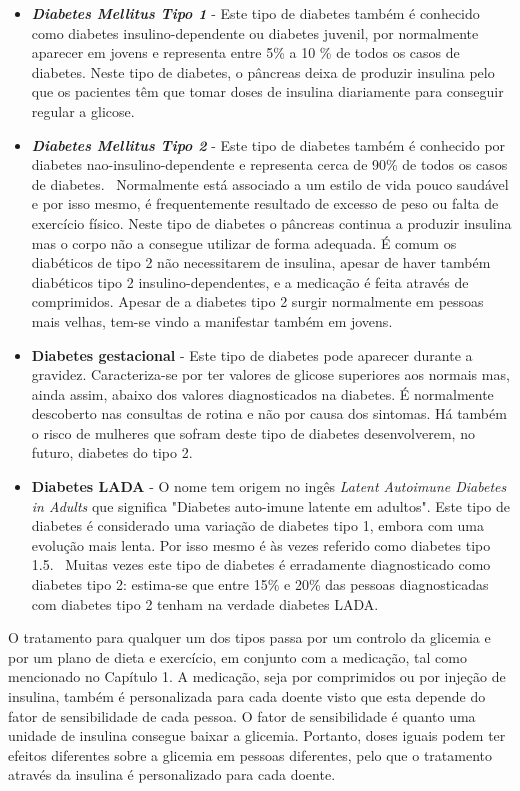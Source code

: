 \begin{itemize}
\item \textit{\textbf{Diabetes Mellitus Tipo 1}} - 
Este tipo de diabetes também é conhecido como diabetes insulino-dependente ou diabetes juvenil, por normalmente aparecer em jovens e representa entre 5\% a 10 \% de todos os casos de diabetes.\cite{epidem}
Neste tipo de diabetes, o pâncreas deixa de produzir insulina pelo que os pacientes têm que tomar doses de insulina diariamente para conseguir regular a glicose.

\item \textit{\textbf{Diabetes Mellitus Tipo 2}} - 
Este tipo de diabetes também é conhecido por diabetes nao-insulino-dependente e representa cerca de 90\% de todos os casos de diabetes.~\cite{type2} Normalmente está associado a um estilo de vida pouco saudável e por isso mesmo, é frequentemente resultado de excesso de peso ou falta de exercício físico. 
Neste tipo de diabetes o pâncreas continua a produzir insulina mas o corpo não a consegue utilizar de forma adequada.  É comum os diabéticos de tipo 2 não necessitarem de insulina, apesar de haver também diabéticos tipo 2 insulino-dependentes, e a medicação é feita através de comprimidos. Apesar de a diabetes tipo 2 surgir normalmente em pessoas mais velhas, tem-se vindo a manifestar também em jovens.

\item {\textbf{Diabetes gestacional}} - 
Este tipo de diabetes pode aparecer durante a gravidez. Caracteriza-se por ter valores de glicose superiores aos normais mas, ainda assim, abaixo dos valores diagnosticados na diabetes.
É normalmente descoberto nas consultas de rotina e não por causa dos sintomas. Há também o risco de mulheres que sofram deste tipo de diabetes desenvolverem, no futuro, diabetes do tipo 2.

\item {\textbf{Diabetes LADA}} - 
O nome tem origem no ingês \textit{Latent Autoimune Diabetes in Adults} que significa "Diabetes auto-imune latente em adultos". 
Este tipo de diabetes é considerado uma variação de diabetes tipo 1, embora com uma evolução mais lenta. Por isso mesmo é às vezes referido como diabetes tipo 1.5.~\cite{type15} Muitas vezes este tipo de diabetes é erradamente diagnosticado como diabetes tipo 2: estima-se que entre 15\% e 20\% das pessoas diagnosticadas com diabetes tipo 2 tenham na verdade diabetes LADA.~\cite{type15}
\end{itemize}

O tratamento para qualquer um dos tipos passa por um controlo da glicemia e por um plano de dieta e exercício, em conjunto com a medicação, tal como mencionado no Capítulo 1. A medicação, seja por comprimidos ou por injeção de insulina, também é personalizada para cada doente visto que esta depende do fator de sensibilidade de cada pessoa.
O fator de sensibilidade é quanto uma unidade de insulina consegue baixar a glicemia. Portanto, doses iguais podem ter efeitos diferentes sobre a glicemia em pessoas diferentes, pelo que o tratamento através da insulina é personalizado para cada doente.

